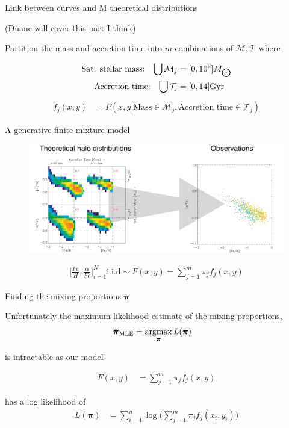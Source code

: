\documentclass{beamer}
\newcommand{\afe}{\frac{\alpha}{Fe}}
\newcommand{\feh}{\frac{Fe}{H}}
\newcommand{\eqn}[1]{\begin{align*}
#1
\end{align*}}
\newcommand{\vect}[1]{\boldsymbol{\mathbf{#1}}}
\newcommand{\argmax}{\operatornamewithlimits{argmax}}
\newcommand{\vp}{\vect{\pi}}
\newcommand{\vph}{\hat{\vect{\pi}}}
\newcommand{\sumn}{\sum^n_{i=1}}
\newcommand{\summ}{\sum^m_{j=1}}
\newcommand{\fab}{f_j}
\begin{document}
\begin{frame}{Link between curves and M theoretical distributions}
	
	(Duane will cover this part I think)
	
	
	Partition the mass and accretion time into $m$ combinations of $\mathcal{M},\mathcal{T}$ where
	
	\eqn{
		\text{Sat. stellar mass:} \hspace{3mm} \bigcup \mathcal{M}_j &= [0, 10^9] M_{\bigodot}  		\\
		\text{Accretion time:} \hspace{3mm} \bigcup \mathcal{T}_j &= [0, 14] \text{Gyr} 
	}
	\eqn{
		f_j(x,y) &= P(x,y|\text{Mass}\in \mathcal{M}_j, \text{Accretion time}\in \mathcal{T}_j)
	}

\end{frame}


\begin{frame}{A generative finite mixture model}
	
	
		
	\begin{figure}
			\begin{center}
				\includegraphics[width=\textwidth]{denstoobs.pdf}
			\end{center}
	\end{figure}
	
	\eqn{
		\Bigg[\feh,\afe\Bigg]_{i=1}^{N} \text{i.i.d} \sim F(x,y) = \sum^m_{j=1} \pi_j f_j(x,y)
	}	
	
\end{frame}







\begin{frame}{Finding the mixing proportions $\vect{\pi}$}
	
	Unfortunately the maximum likelihood estimate of the mixing proportions,
	\eqn{
		\vph_{\text{MLE}} &= \argmax_{\vp} L(\vect{\pi})
	}
	
	
	is intractable as our model
	
	\eqn{
		F(x,y) &= \sum^m_{j=1} \pi_j f_j(x,y)
	}
	
	has a log likelihood of
	\eqn{
		L(\vect{\pi}) &= \sumn \log \Big( \summ \pi_j \fab(x_i,y_i)  \Big)
	}
	
	
	
	
\end{frame}
\end{document}
